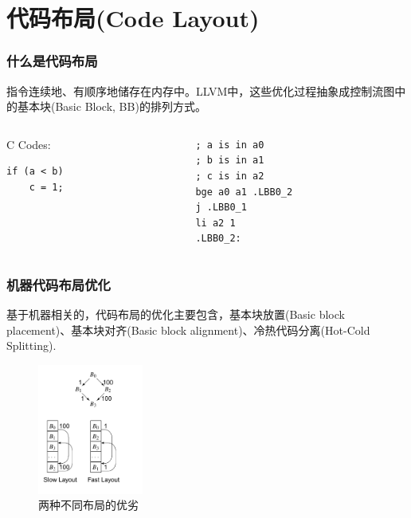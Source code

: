 \section{代码布局(Code Layout)}

\begin{frame}[fragile]
    \frametitle{什么是代码布局}
    指令连续地、有顺序地储存在内存中。LLVM中，这些优化过程抽象成控制流图中的基本块(Basic Block, BB)的排列方式。

    \begin{columns}
        \begin{column}{0.2\textwidth}
            \centering
            C Codes:
            \begin{lstlisting}
if (a < b)
    c = 1;\end{lstlisting}
        \end{column}
        \begin{column}{0.5\textwidth}
\begin{lstlisting}[language={[RISC-V]Assembler}]
; a is in a0
; b is in a1
; c is in a2
bge a0 a1 .LBB0_2
j .LBB0_1
li a2 1
.LBB0_2:\end{lstlisting}
        \end{column}
    \end{columns}
\end{frame}

\begin{frame}
    \frametitle{机器代码布局优化}
    基于机器相关的，代码布局的优化主要包含，基本块放置(Basic block placement)、基本块对齐(Basic block alignment)、冷热代码分离(Hot-Cold Splitting)\cite{bakhvalov-2019}.
    \begin{figure}
        \centering
        \includegraphics[width=0.31\textwidth]{images/layout_compare.png}
        \caption{两种不同布局的优劣\cite{cooper2011engineering}}
    \end{figure}

\end{frame}


